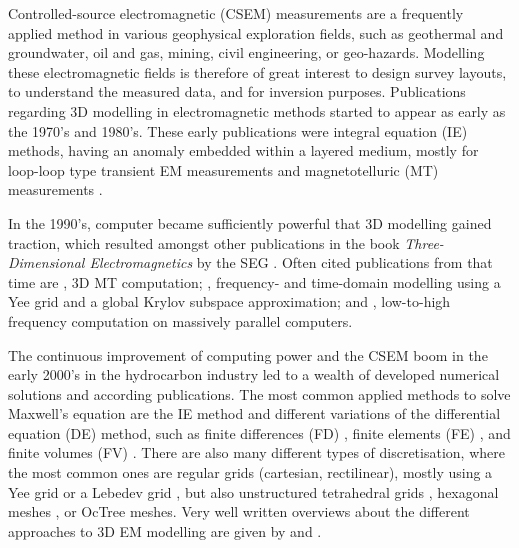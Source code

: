 \documentclass[
    paper,
  ]{geophysics}
\begin{document}
Controlled-source electromagnetic (CSEM) measurements are a frequently applied
method in various geophysical exploration fields, such as geothermal and
groundwater, oil and gas, mining, civil engineering, or geo-hazards. Modelling
these electromagnetic fields is therefore of great interest to design survey
layouts, to understand the measured data, and for inversion purposes.
Publications regarding 3D modelling in electromagnetic methods started to
appear as early as the 1970's and 1980's. These early publications were
integral equation (IE) methods, having an anomaly embedded within a layered
medium, mostly for loop-loop type transient EM measurements
\citep{GJI.74.Raiche, GEO.75.Hohmann, GJI.82.Das, GEO.86.Newman} and
magnetotelluric (MT) measurements \citep{GEO.84.Wannamaker}.

In the 1990's, computer became sufficiently powerful that 3D modelling gained
traction, which resulted amongst other publications in the book
\emph{Three-Dimensional Electromagnetics} by the SEG
\citep{B.SEG.99.Oristaglio}. Often cited publications from that time are
\cite{RSC.94.Mackie}, 3D MT computation; \cite{RS.94.Druskin}, frequency- and
time-domain modelling using a Yee grid and a global Krylov subspace
approximation; and \cite{RS.96.Alumbaugh, GJI.97.Newman}, low-to-high frequency
computation on massively parallel computers.

The continuous improvement of computing power and the CSEM boom in the early
2000's in the hydrocarbon industry led to a wealth of developed numerical
solutions and according publications. The most common applied methods to solve
Maxwell's equation are the IE method \citep{GJI.74.Raiche, RS.02.Hursan,
GEO.06.Zhdanov, GP.10.Tehrani, CAG.16.Kruglyakov, MGS.17.Kruglyakov} and
different variations of the differential equation (DE) method, such as finite
differences (FD) \citep{IEEE.66.Yee, GEO.93.Wang, RSC.94.Mackie, RS.94.Druskin,
GEO.09.Streich, CAG.13.Sommer}, finite elements (FE) \citep{GEO.04.Commer,
GJI.11.Schwarzbach,GEO.12.daSilva, GJI.13.Grayver, GJI.13.Puzyrev,
SEG.16.Zhang}, and finite volumes (FV) \citep{EM.90.Madsen, PIER.01.Clemens,
GP.06.Mulder, ECP.07.Haber, GEO.14.Jahandari}. There are also many different
types of discretisation, where the most common ones are regular grids
(cartesian, rectilinear), mostly using a Yee grid \citep{IEEE.66.Yee} or a
Lebedev grid \citep{CMMP.64.Lebedev}, but also unstructured tetrahedral grids
\citep{SEG.16.Zhang, CAG.17.Cai}, hexagonal meshes \citep{CAG.14.Cai}, or
OcTree meshes\citep{ECP.07.Haber}. Very well written overviews about the
different approaches to 3D EM modelling are given by \cite{SG.05.Avdeev} and
\cite{SG.10.Borner}.
\end{document}
